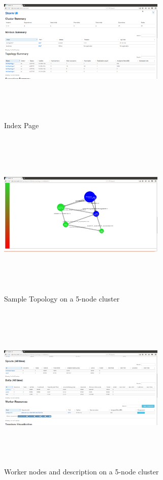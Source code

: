 \documentclass[9pt,twocolumn,twoside]{../../styles/osajnl}
\begin{document}
\begin{figure}[!htb]
  \includegraphics[width=8cm,height=8cm,keepaspectratio,width=\linewidth]{images/bench-1.png}
  \caption{Index Page}
  \label{Index Page}
\end{figure}

\begin{figure}[!htb]
  \includegraphics[width=8cm,height=8cm,keepaspectratio,width=\linewidth]{images/bench-2.png}
  \caption{Sample Topology on a 5-node cluster }
  \label{Sample Topology on a 5-node cluster}
\end{figure}

\begin{figure}[!htb]
  \includegraphics[width=8cm,height=8cm,keepaspectratio,width=\linewidth]{images/bench-3.png}
  \caption{Worker nodes and description on a 5-node cluster }
  \label{Worker nodes and description on a 5-node cluster}
\end{figure}
\end{document}
